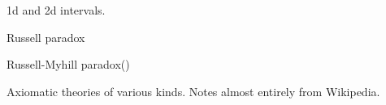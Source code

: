  
1d and 2d intervals.
 
% 
% 
% 
% 
% 
% 
\setcounter{currentlevel}{\value{baseSectionLevel}}
\label{sec:Paradoxes}

Russell paradox~\cite{iep:RussellParadox}

Russell-Myhill paradox(\cite{iep:RussellMyhillParadox})

\setcounter{currentlevel}{\value{baseSectionLevel}}


Axiomatic theories of various kinds.
Notes almost entirely from 
Wikipedia\cite{wiki:Set_theory,iep:SetTheory,eom:SetTheory,sep:SetTheory}.

\label{sec:Cantor_set_theory}

